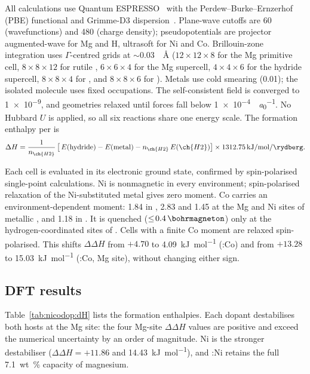 \documentclass[11pt,a4paper]{article}
\begin{document}
All calculations use Quantum ESPRESSO~\cite{giannozzi2017} with the
Perdew--Burke--Ernzerhof (PBE) functional and Grimme-D3
dispersion~\cite{grimme2010}. Plane-wave cutoffs are \SI{60}{\rydberg}
(wavefunctions) and \SI{480}{\rydberg} (charge density); pseudopotentials are
projector augmented-wave for Mg and H, ultrasoft for Ni and Co.
Brillouin-zone integration uses $\Gamma$-centred grids at
$\sim$\SI{0.03}{\per\angstrom} ($12\!\times\!12\!\times\!8$ for the Mg
primitive cell, $8\!\times\!8\!\times\!12$ for rutile ,
$6\!\times\!6\!\times\!4$ for the Mg supercell, $4\!\times\!4\!\times\!6$ for
the hydride supercell, $8\!\times\!8\!\times\!4$ for , and
$8\!\times\!8\!\times\!6$ for ). Metals use cold smearing
(\SI{0.01}{\rydberg}); the isolated  molecule uses fixed occupations.
The self-consistent field is converged to \SI{1e-9}{\rydberg}, and geometries
relaxed until forces fall below \SI{1e-4}{\rydberg\per\bohr}. No Hubbard $U$
is applied, so all six reactions share one energy scale. The formation
enthalpy per  is
\begin{equation}
\Delta H = \frac{1}{n_{\ch{H2}}}\,
   \bigl[\,E(\text{hydride}) - E(\text{metal}) - n_{\ch{H2}}\,E(\ch{H2})\bigr]
   \times \SI{1312.75}{\kilo\joule\per\mol\per\rydberg}.
\end{equation}

Each cell is evaluated in its electronic ground state, confirmed by
spin-polarised single-point calculations. Ni is nonmagnetic in every
environment; spin-polarised relaxation of the Ni-substituted metal gives zero
moment. Co carries an environment-dependent moment:
\SI{1.84}{\bohrmagneton} in , \SI{2.83}{\bohrmagneton} and
\SI{1.45}{\bohrmagneton} at the Mg and Ni sites of metallic , and
\SI{1.18}{\bohrmagneton} in . It is quenched
($\le\!\SI{0.4}{\bohrmagneton}$) only at the hydrogen-coordinated sites of
. Cells with a finite Co moment are relaxed spin-polarised. This
shifts $\Delta\Delta H$ from $+4.70$ to \SI{+4.09}{\kilo\joule\per\mol}
(:Co) and from $+13.28$ to \SI{+15.03}{\kilo\joule\per\mol}
(:Co, Mg site), without changing either sign.

\subsection{DFT results}
\label{sec:nicodop:results}

Table~\ref{tab:nicodop:dH} lists the formation enthalpies. Each dopant
destabilises both hosts at the Mg site: the four Mg-site $\Delta\Delta H$
values are positive and exceed the numerical uncertainty by an order of
magnitude. Ni is the stronger destabiliser ($\Delta\Delta H = +11.86$ and
\SI{+14.43}{\kilo\joule\per\mol}), and :Ni retains the full
\SI{7.1}{wt.\percent} capacity of magnesium.
\end{document}
